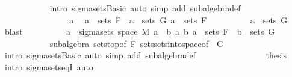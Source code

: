 \begin{isabellebody}
\ \ \ \ \ \ \ \ \ \ \isamarkupfalse%
\ {\isacharparenleft}{\kern0pt}intro\ sigma{\isacharunderscore}{\kern0pt}sets{\isachardot}{\kern0pt}Basic{\isacharcomma}{\kern0pt}\ auto\ simp\ add{\isacharcolon}{\kern0pt}\ subalgebra{\isacharunderscore}{\kern0pt}def{\isacharparenright}{\kern0pt}\isanewline
\ \ \ \ \ \ \isacommand{{\isacharbraceright}{\kern0pt}}\isamarkupfalse%
\isanewline
\ \ \ \ \ \ \isamarkupfalse%
\isanewline
\ \ \ \ \ \ \isacommand{{\isacharbraceleft}{\kern0pt}}\isamarkupfalse%
\isanewline
\ \ \ \ \ \ \ \ \isamarkupfalse%
\ a\ \isamarkupfalse%
\ {\isachardoublequoteopen}a\ {\isasymin}\ sets\ F\ {\isasymor}\ a\ {\isasymin}\ sets\ G{\isachardoublequoteclose}\ {\isachardoublequoteopen}a\ {\isasymnotin}\ sets\ F{\isachardoublequoteclose}\isanewline
\ \ \ \ \ \ \ \ \isamarkupfalse%
\ {\isachardoublequoteopen}a\ {\isasymin}\ sets\ G{\isachardoublequoteclose}\ \isamarkupfalse%
\ blast\isanewline
\ \ \ \ \ \ \ \ \isamarkupfalse%
\ {\isachardoublequoteopen}a\ {\isasymin}\ sigma{\isacharunderscore}{\kern0pt}sets\ {\isacharparenleft}{\kern0pt}space\ M{\isacharparenright}{\kern0pt}\ {\isacharbraceleft}{\kern0pt}a\ {\isasyminter}\ b\ {\isacharbar}{\kern0pt}a\ b{\isachardot}{\kern0pt}\ a\ {\isasymin}\ sets\ F\ {\isasymand}\ b\ {\isasymin}\ sets\ G{\isacharbraceright}{\kern0pt}{\isachardoublequoteclose}\ \isanewline
\ \ \ \ \ \ \ \ \ \ \isamarkupfalse%
\ subalgebra\ sets{\isachardot}{\kern0pt}top{\isacharbrackleft}{\kern0pt}of\ F{\isacharbrackright}{\kern0pt}\ sets{\isachardot}{\kern0pt}sets{\isacharunderscore}{\kern0pt}into{\isacharunderscore}{\kern0pt}space{\isacharbrackleft}{\kern0pt}of\ {\isacharunderscore}{\kern0pt}\ G{\isacharbrackright}{\kern0pt}\ \isanewline
\ \ \ \ \ \ \ \ \ \ \isamarkupfalse%
\ {\isacharparenleft}{\kern0pt}intro\ sigma{\isacharunderscore}{\kern0pt}sets{\isachardot}{\kern0pt}Basic{\isacharcomma}{\kern0pt}\ auto\ simp\ add{\isacharcolon}{\kern0pt}\ subalgebra{\isacharunderscore}{\kern0pt}def{\isacharparenright}{\kern0pt}\isanewline
\ \ \ \ \ \ \isacommand{{\isacharbraceright}{\kern0pt}}\isamarkupfalse%
\isanewline
\ \ \ \ \ \ \isamarkupfalse%
\ \isamarkupfalse%
\ {\isacharquery}{\kern0pt}thesis\ \isamarkupfalse%
\ {\isacharparenleft}{\kern0pt}intro\ sigma{\isacharunderscore}{\kern0pt}sets{\isacharunderscore}{\kern0pt}eqI{\isacharparenright}{\kern0pt}\ auto\isanewline
\ \ \ \ \isamarkupfalse%
\isanewline
\ \ \ \ \isamarkupfalse%

\end{isabellebody}
